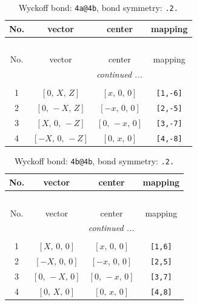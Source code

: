 \documentclass[fleqn,8pt]{jsarticle}
\begin{document}
\begin{longtable}{cccc}
\caption{Wyckoff bond: {\tt 4a@4b}, bond symmetry: {\tt .2.}}
 \\
 \hline \hline
No. & vector & center & mapping \\ \hline \endfirsthead

\multicolumn{3}{l}{\tablename\ \thetable{}} \\
 \hline \hline
No. & vector & center & mapping \\ \hline \endhead

 \hline \hline
\multicolumn{3}{r}{\footnotesize\it continued ...} \\ \endfoot

 \hline \hline
\multicolumn{3}{r}{} \\ \endlastfoot

1 & $\left[ 0,\, X,\, Z \right]$ & $\left[ x,\, 0,\, 0 \right]$ & {\tt [1,-6]} \\ \hline
2 & $\left[ 0,\, - X,\, Z \right]$ & $\left[ - x,\, 0,\, 0 \right]$ & {\tt [2,-5]} \\ \hline
3 & $\left[ X,\, 0,\, - Z \right]$ & $\left[ 0,\, - x,\, 0 \right]$ & {\tt [3,-7]} \\ \hline
4 & $\left[ - X,\, 0,\, - Z \right]$ & $\left[ 0,\, x,\, 0 \right]$ & {\tt [4,-8]} \\
\end{longtable}
\renewcommand{\arraystretch}{1.2}
\begin{longtable}{cccc}
\caption{Wyckoff bond: {\tt 4b@4b}, bond symmetry: {\tt .2.}}
 \\
 \hline \hline
No. & vector & center & mapping \\ \hline \endfirsthead

\multicolumn{3}{l}{\tablename\ \thetable{}} \\
 \hline \hline
No. & vector & center & mapping \\ \hline \endhead

 \hline \hline
\multicolumn{3}{r}{\footnotesize\it continued ...} \\ \endfoot

 \hline \hline
\multicolumn{3}{r}{} \\ \endlastfoot

1 & $\left[ X,\, 0,\, 0 \right]$ & $\left[ x,\, 0,\, 0 \right]$ & {\tt [1,6]} \\ \hline
2 & $\left[ - X,\, 0,\, 0 \right]$ & $\left[ - x,\, 0,\, 0 \right]$ & {\tt [2,5]} \\ \hline
3 & $\left[ 0,\, - X,\, 0 \right]$ & $\left[ 0,\, - x,\, 0 \right]$ & {\tt [3,7]} \\ \hline
4 & $\left[ 0,\, X,\, 0 \right]$ & $\left[ 0,\, x,\, 0 \right]$ & {\tt [4,8]} \\
\end{longtable}
\end{document}
